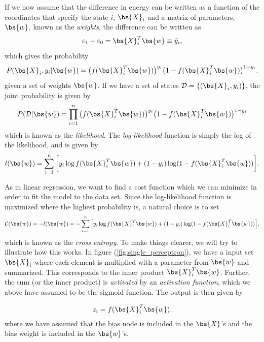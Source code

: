 If we now assume that the difference in energy can be written as a function of the coordinates that specify the state $i$, $\bs{X}_i$ and a matrix of parameters, $\bs{w}$, known as the \textit{weights}, the difference can be written as
\begin{equation}
\varepsilon_1-\varepsilon_0=\bs{X}_i^T\bs{w}\equiv\tilde{y}_i,
\end{equation}
which gives the probability
\begin{equation}
P(\bs{X}_i,y_i|\bs{w})=\big(f(\bs{X}_i^T\bs{w})\big)^{y_i}\big(1-f(\bs{X}_i^T\bs{w})\big)^{1-y_i}.
\end{equation}
given a set of weights $\bs{w}$. If we have a set of states $\mathcal{D}=\{(\bs{X}_i,y_i)\}$, the joint probability is given by
\begin{equation}
P(\mathcal{D}|\bs{w})=\prod_{i=1}^n\big(f(\bs{X}_i^T\bs{w})\big)^{y_i}\big(1-f(\bs{X}_i^T\bs{w})\big)^{1-y_i}
\end{equation}
which is known as the \textit{likelihood}. The \textit{log-likelihood} function is simply the log of the likelihood, and is given by 
\begin{equation}
l(\bs{w})=\sum_{i=1}^n\bigg[y_i\log f(\bs{X}_i^T\bs{w})+(1-y_i)\log(1-f(\bs{X}_i^T\bs{w}))\bigg].
\end{equation}

As in linear regression, we want to find a cost function which we can minimize in order to fit the model to the data set. Since the log-likelihood function is maximized where the highest probability is, a natural choice is to set
\begin{equation}
\mathcal{C}(\bs{w})=-l(\bs{w})=-\sum_{i=1}^n\Big[y_i\log f(\bs{X}_i^T\bs{w})+(1-y_i)\log(1-f(\bs{X}_i^T\bs{w}))\Big],
\end{equation}
which is known as the \textit{cross entropy}. To make things clearer, we will try to illustrate how this works. In figure (\ref{fig:single_perceptron}), we have a input set $\bs{X}_i$ where each element is multiplied with a parameter from $\bs{w}$ and summarized. This corresponds to the inner product $\bs{X}_i^T\bs{w}$. Further, the sum (or the inner product) is \textit{activated} by an \textit{activation function}, which we above have assumed to be the sigmoid function. The output is then given by

\begin{eqnarray}
z_i=f(\bs{X}_i^T\bs{w}).
\end{eqnarray}
where we have assumed that the bias node is included in the $\bs{X}$'s and the bias weight is included in the $\bs{w}$'s.

